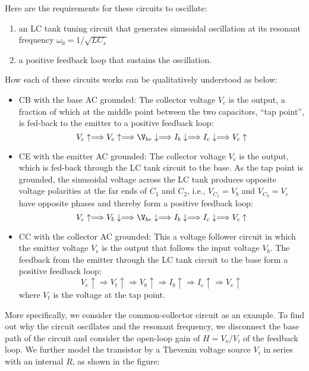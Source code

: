 Here are the requirements for these circuits to oscillate:
\begin{enumerate}
\item an LC tank tuning circuit that generates sinusoidal oscillation 
  at its resonant frequency $\omega_0=1/\sqrt{LC_s}$
\item a positive feedback loop that sustains the oscillation.
\end{enumerate}
How each of these circuits works can be qualitatively understood as 
below:
\begin{itemize}
\item CB with the base AC grounded: The collector voltage $V_c$ is the 
  output, a fraction of which at the middle point between the two 
  capacitors, ``tap point'', is fed-back to the emitter to a positive 
  feedback loop:
  \[
  V_c\uparrow\Longrightarrow V_e\uparrow\Longrightarrow \V_{be}\downarrow
  \Longrightarrow I_b\downarrow \Longrightarrow I_c\downarrow
  \Longrightarrow V_c\uparrow
  \]
\item CE with the emitter AC grounded: The collector voltage $V_c$ is 
  the output, which is fed-back through the LC tank circuit to the base. 
  As the tap point is grounded, the sinusoidal voltage across the LC
  tank produces opposite voltage polarities at the far ends of $C_1$ 
  and $C_2$, i.e., $V_{C_1}=V_b$ and $V_{C_2}=V_c$ have opposite phases 
  and thereby form a positive feedback loop:  
  \[
  V_c\uparrow\Longrightarrow V_b\downarrow\Longrightarrow \V_{be}\downarrow
  \Longrightarrow I_b\downarrow \Longrightarrow I_c\downarrow
  \Longrightarrow V_c\uparrow
  \]
\item CC with the collector AC grounded: This a voltage follower circuit
  in which the emitter voltage $V_e$ is the output that follows the input
  voltage $V_b$. The feedback from the emitter through the LC tank circuit 
  to the base form a positive feedback loop:
  \[
  V_e\uparrow\Longrightarrow V_t\uparrow\Longrightarrow V_b\uparrow
  \Longrightarrow I_b\uparrow\Longrightarrow I_e\uparrow
  \Longrightarrow V_e\uparrow
  \]
  where $V_t$ is the voltage at the tap point.

\end{itemize}

More specifically, we consider the common-collector circuit as an example.
To find out why the circuit oscillates and the resonant frequency, we 
disconnect the base path of the circuit and consider the open-loop gain 
of $H=V_o/V_i$ of the feedback loop. We further model the transistor 
by a Thevenin voltage source $V_i$ in series with an internal $R$, as 
shown in the figure:

